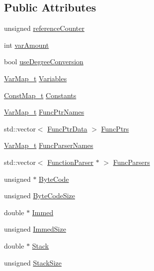 \subsection*{Public Attributes}
\begin{DoxyCompactItemize}
\item 
unsigned \hyperlink{struct_function_parser_1_1_data_a73a9146066451148d4ec8fe8c0ec8418}{reference\+Counter}
\item 
int \hyperlink{struct_function_parser_1_1_data_af882554224f4977d69c5593254ac210e}{var\+Amount}
\item 
bool \hyperlink{struct_function_parser_1_1_data_a2e34291302b3dfafd29d64a6aacecb1f}{use\+Degree\+Conversion}
\item 
\hyperlink{struct_function_parser_1_1_data_a02f3fbca3164d0e498312b418258ea84}{Var\+Map\+\_\+t} \hyperlink{struct_function_parser_1_1_data_ab5d416f3bb9086ea069ce85831e4cff6}{Variables}
\item 
\hyperlink{struct_function_parser_1_1_data_a74ff90f5d1687b68363d1602ef0ccece}{Const\+Map\+\_\+t} \hyperlink{struct_function_parser_1_1_data_a832899b555441fe2ce6bfaf5e0c19f6d}{Constants}
\item 
\hyperlink{struct_function_parser_1_1_data_a02f3fbca3164d0e498312b418258ea84}{Var\+Map\+\_\+t} \hyperlink{struct_function_parser_1_1_data_aca8bc3c4c9840a4ce7fc75a6fb6d0e61}{Func\+Ptr\+Names}
\item 
std\+::vector$<$ \hyperlink{struct_function_parser_1_1_data_1_1_func_ptr_data}{Func\+Ptr\+Data} $>$ \hyperlink{struct_function_parser_1_1_data_a1ba8025daa062d7eef15b95a49c4607f}{Func\+Ptrs}
\item 
\hyperlink{struct_function_parser_1_1_data_a02f3fbca3164d0e498312b418258ea84}{Var\+Map\+\_\+t} \hyperlink{struct_function_parser_1_1_data_ac552328a6854b174a7d085d9df0c8943}{Func\+Parser\+Names}
\item 
std\+::vector$<$ \hyperlink{class_function_parser}{Function\+Parser} $\ast$ $>$ \hyperlink{struct_function_parser_1_1_data_a29d036708b0524b8ff0ddd3e6248ef6f}{Func\+Parsers}
\item 
unsigned $\ast$ \hyperlink{struct_function_parser_1_1_data_a113be528db3c02713aa9887732897f8d}{Byte\+Code}
\item 
unsigned \hyperlink{struct_function_parser_1_1_data_a6037b3f5d5d8854dfd9ec15b9ac0924f}{Byte\+Code\+Size}
\item 
double $\ast$ \hyperlink{struct_function_parser_1_1_data_a5a1b2b3c4adaed1b098413547cc67ce3}{Immed}
\item 
unsigned \hyperlink{struct_function_parser_1_1_data_a6391f52f7d877cdde635f758d7e9fdbb}{Immed\+Size}
\item 
double $\ast$ \hyperlink{struct_function_parser_1_1_data_a1ba27ea1afffc0f361e4da36723caaa7}{Stack}
\item 
unsigned \hyperlink{struct_function_parser_1_1_data_afb5f715f8c45ce98b654cb169e656c8b}{Stack\+Size}
\end{DoxyCompactItemize}


